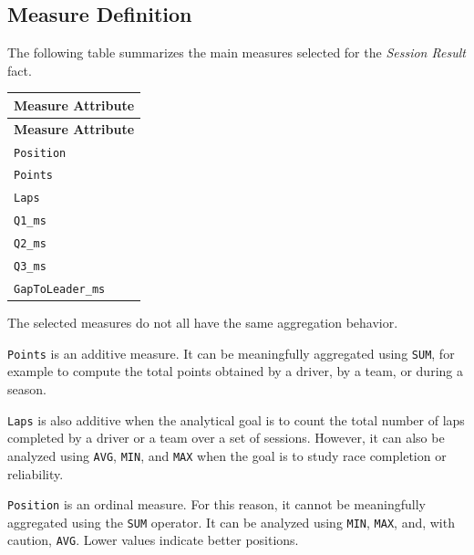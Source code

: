 \documentclass[a4paper,11pt]{article}
\begin{document}
	\subsection{Measure Definition}
	

	The following table summarizes the main measures selected for the
	\textit{Session Result} fact.
	
	\begin{longtable}{|p{8cm}|}
		\hline
		\textbf{Measure Attribute} \\
		\hline
		\endfirsthead
		
		\hline
		\textbf{Measure Attribute} \\
		\hline
		\endhead
		
		\texttt{Position} \\
		\hline
		
		\texttt{Points} \\
		\hline
		
		\texttt{Laps} \\
		\hline
		
		\texttt{Q1\_ms} \\
		\hline
		
		\texttt{Q2\_ms} \\
		\hline
		
		\texttt{Q3\_ms} \\
		\hline
		
		\texttt{GapToLeader\_ms} \\
		\hline
		
	\end{longtable}
	
	The selected measures do not all have the same aggregation behavior.
	
	\texttt{Points} is an additive measure. It can be meaningfully aggregated using
	\texttt{SUM}, for example to compute the total points obtained by a driver, by a team,
	or during a season.
	
	\texttt{Laps} is also additive when the analytical goal is to count the total number of
	laps completed by a driver or a team over a set of sessions. However, it can also be
	analyzed using \texttt{AVG}, \texttt{MIN}, and \texttt{MAX} when the goal is to study
	race completion or reliability.
	
	\texttt{Position} is an ordinal measure. For this reason, it cannot be meaningfully
	aggregated using the \texttt{SUM} operator. It can be analyzed using \texttt{MIN},
	\texttt{MAX}, and, with caution, \texttt{AVG}. Lower values indicate better positions.
	
\end{document}
